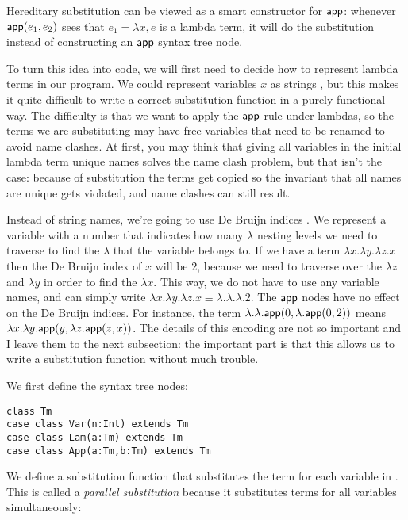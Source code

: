 Hereditary substitution can be viewed as a smart constructor for $\mathsf{app}$: whenever $\mathsf{app}(e_1,e_2)$ sees that $e_1 = \lambda x, e$ is a lambda term, it will do the substitution instead of constructing an $\mathsf{app}$ syntax tree node.

To turn this idea into code, we will first need to decide how to represent lambda terms in our program.
We could represent variables $x$ as strings , but this makes it quite difficult to write a correct substitution function in a purely functional way.
The difficulty is that we want to apply the $\mathsf{app}$ rule under lambdas, so the terms we are substituting may have free variables that need to be renamed to avoid name clashes.
At first, you may think that giving all variables in the initial lambda term unique names solves the name clash problem, but that isn't the case: because of substitution the terms get copied so the invariant that all names are unique gets violated, and name clashes can still result.

Instead of string names, we're going to use De Bruijn indices \cite{BruijnIndex2021}.
We represent a variable with a number that indicates how many $\lambda$ nesting levels we need to traverse to find the $\lambda$ that the variable belongs to.
If we have a term $\lambda x. \lambda y. \lambda z. x$ then the De Bruijn index of $x$ will be $2$, because we need to traverse over the $\lambda z$ and $\lambda y$ in order to find the $\lambda x$.
This way, we do not have to use any variable names, and can simply write $\lambda x. \lambda y. \lambda z. x \equiv \lambda. \lambda. \lambda. 2$.
The $\mathsf{app}$ nodes have no effect on the De Bruijn indices.
For instance, the term $\lambda. \lambda. \mathsf{app}(0,\lambda. \mathsf{app}(0,2))$ means $\lambda x. \lambda y. \mathsf{app}(y, \lambda z. \mathsf{app}(z,x))$.
The details of this encoding are not so important and I leave them to the next subsection: the important part is that this allows us to write a substitution function without much trouble.

We first define the syntax tree nodes:
\begin{lstlisting}
class Tm
case class Var(n:Int) extends Tm
case class Lam(a:Tm) extends Tm
case class App(a:Tm,b:Tm) extends Tm
\end{lstlisting}

We define a substitution function  that substitutes the term  for each variable  in . This is called a \emph{parallel substitution} because it substitutes terms for all variables simultaneously:

